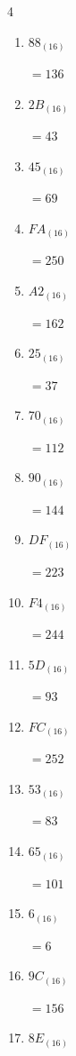 \begin{multicols}{4}
\begin{enumerate}
  \item $88_{(16)}$

        $=136$

  \item $2B_{(16)}$

        $=43$

  \item $45_{(16)}$

        $=69$

  \item $FA_{(16)}$

        $=250$

  \item $A2_{(16)}$

        $=162$

\columnbreak %

  \item $25_{(16)}$

        $=37$

  \item $70_{(16)}$

        $=112$

  \item $90_{(16)}$

        $=144$

  \item $DF_{(16)}$

        $=223$

  \item $F4_{(16)}$

        $=244$

  \item $5D_{(16)}$

        $=93$

  \item $FC_{(16)}$

        $=252$

  \item $53_{(16)}$

        $=83$

  \item $65_{(16)}$

        $=101$

  \item $6_{(16)}$

        $=6$

  \item $9C_{(16)}$

        $=156$

  \item $8E_{(16)}$


\end{enumerate}
\end{multicols}
